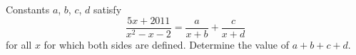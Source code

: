 Constants $a$, $b$, $c$, $d$ satisfy
\[
\dfrac{5x+2011}{x^2-x-2}=\dfrac{a}{x+b}+\dfrac{c}{x+d}
\]
for all $x$ for which both sides are defined. Determine the value of $a+b+c+d$.
